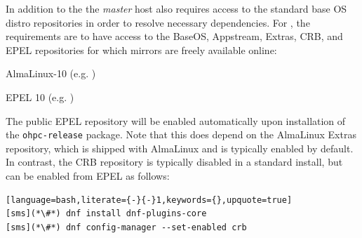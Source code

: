 In addition to the \OHPC{}
\iftoggle{isxCAT}{and \xCAT{} package repositories,}{package repository,}
the {\em master} host also requires access to the standard base OS distro
repositories in order to resolve necessary dependencies. For \baseOS{}, the
requirements are to have access to the BaseOS, Appstream, Extras, CRB,
and EPEL repositories for which mirrors are freely available online:

\begin{itemize*}
\item AlmaLinux-10
  (e.g. \href{https://repo.almalinux.org/almalinux/10/}
             {\color{blue}{https://repo.almalinux.org/almalinux/10/}} )
\item EPEL 10 (e.g. \href{http://download.fedoraproject.org/pub/epel/10/}
                        {\color{blue}{http://download.fedoraproject.org/pub/epel/10/}} )
\end{itemize*}

\noindent The public EPEL repository will be enabled automatically upon
installation of the \texttt{ohpc-release} package. Note that this does depend
on the AlmaLinux Extras repository, which is shipped with AlmaLinux and is typically
enabled by default.  In contrast, the CRB repository is typically
disabled in a standard install, but can be enabled from EPEL as follows:

\begin{lstlisting}[language=bash,literate={-}{-}1,keywords={},upquote=true]
[sms](*\#*) dnf install dnf-plugins-core
[sms](*\#*) dnf config-manager --set-enabled crb
\end{lstlisting}
